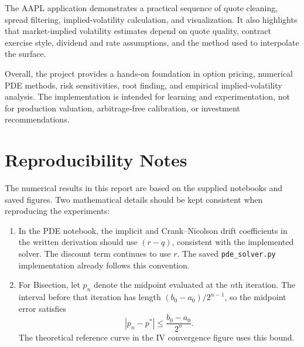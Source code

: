 \documentclass[11pt,a4paper]{article}
\begin{document}
The AAPL application demonstrates a practical sequence of quote cleaning, spread filtering, implied-volatility calculation, and visualization. It also highlights that market-implied volatility estimates depend on quote quality, contract exercise style, dividend and rate assumptions, and the method used to interpolate the surface.

Overall, the project provides a hands-on foundation in option pricing, numerical PDE methods, risk sensitivities, root finding, and empirical implied-volatility analysis. The implementation is intended for learning and experimentation, not for production valuation, arbitrage-free calibration, or investment recommendations.

\section*{Reproducibility Notes}
The numerical results in this report are based on the supplied notebooks and saved figures. Two mathematical details should be kept consistent when reproducing the experiments:
\begin{enumerate}
  \item In the PDE notebook, the implicit and Crank--Nicolson drift coefficients in the written derivation should use $(r-q)$, consistent with the implemented solver. The discount term continues to use $r$. The saved \texttt{pde\_solver.py} implementation already follows this convention.
  \item For Bisection, let $p_n$ denote the midpoint evaluated at the $n$th iteration. The interval before that iteration has length $(b_0-a_0)/2^{n-1}$, so the midpoint error satisfies
  \[
    |p_n-p^*|\leq \frac{b_0-a_0}{2^n}.
  \]
  The theoretical reference curve in the IV convergence figure uses this bound.
\end{enumerate}
\end{document}
